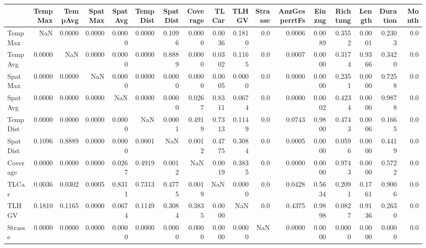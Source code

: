 \begin{tabular}{lrrrrrrrrrrrrrrrr}
\toprule
{} &  TempMax &  TempAvg &  SpatMax &  SpatAvg &  TempDist &  SpatDist &  Coverage &   TLCar &   TLHGV &  Strasse &  AnzGesperrtFs &  Einzug &  Richtung &  Length &  Duration &  Month \\
\midrule
TempMax       &      NaN &   0.0000 &   0.0000 &   0.0000 &    0.0000 &    0.1096 &    0.0000 &  0.0036 &  0.1810 &      0.0 &         0.0006 &  0.0089 &    0.3552 &  0.0001 &    0.2303 &    0.0 \\
TempAvg       &   0.0000 &      NaN &   0.0000 &   0.0000 &    0.0000 &    0.8889 &    0.0000 &  0.0302 &  0.1165 &      0.0 &         0.0007 &  0.0000 &    0.3174 &  0.9366 &    0.3420 &    0.0 \\
SpatMax       &   0.0000 &   0.0000 &      NaN &   0.0000 &    0.0000 &    0.0000 &    0.0000 &  0.0005 &  0.0000 &      0.0 &         0.0000 &  0.0000 &    0.2351 &  0.0000 &    0.7258 &    0.0 \\
SpatAvg       &   0.0000 &   0.0000 &   0.0000 &      NaN &    0.0000 &    0.0000 &    0.0267 &  0.8311 &  0.0674 &      0.0 &         0.0000 &  0.0002 &    0.4234 &  0.0000 &    0.9878 &    0.0 \\
TempDist      &   0.0000 &   0.0000 &   0.0000 &   0.0000 &       NaN &    0.0001 &    0.4919 &  0.7313 &  0.1149 &      0.0 &         0.0743 &  0.9800 &    0.4743 &  0.0006 &    0.1665 &    0.0 \\
SpatDist      &   0.1096 &   0.8889 &   0.0000 &   0.0000 &    0.0001 &       NaN &    0.0012 &  0.4775 &  0.3084 &      0.0 &         0.0005 &  0.0000 &    0.0596 &  0.0000 &    0.4419 &    0.0 \\
Coverage      &   0.0000 &   0.0000 &   0.0000 &   0.0267 &    0.4919 &    0.0012 &       NaN &  0.0019 &  0.3835 &      0.0 &         0.0000 &  0.0000 &    0.9743 &  0.0000 &    0.5722 &    0.0 \\
TLCar         &   0.0036 &   0.0302 &   0.0005 &   0.8311 &    0.7313 &    0.4775 &    0.0019 &     NaN &  0.0000 &      0.0 &         0.0428 &  0.5634 &    0.2091 &  0.1761 &    0.9006 &    0.0 \\
TLHGV         &   0.1810 &   0.1165 &   0.0000 &   0.0674 &    0.1149 &    0.3084 &    0.3835 &  0.0000 &     NaN &      0.0 &         0.4375 &  0.9898 &    0.0827 &  0.9136 &    0.2630 &    0.0 \\
Strasse       &   0.0000 &   0.0000 &   0.0000 &   0.0000 &    0.0000 &    0.0000 &    0.0000 &  0.0000 &  0.0000 &      NaN &         0.0000 &  0.0000 &    0.0000 &  0.0000 &    0.0000 &    0.0 \\

\end{tabular}
